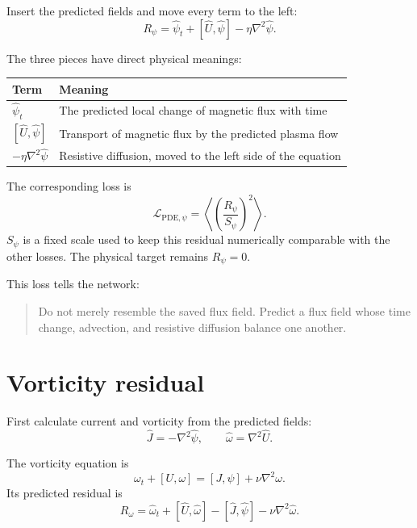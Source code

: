 \documentclass[11pt]{article}
\newcommand{\bracket}[2]{\left[#1,#2\right]}
\newcommand{\avg}[1]{\left\langle #1\right\rangle}
\newcommand{\Rpsi}{R_{\psi}}
\newcommand{\Romega}{R_{\omega}}
\newcommand{\Lpdepsi}{\mathcal L_{\mathrm{PDE},\psi}}
\begin{document}
Insert the predicted fields and move every term to the left:
\begin{equation}
\boxed{
\Rpsi
=\widehat\psi_t
+\bracket{\widehat U}{\widehat\psi}
-\eta\nabla^2\widehat\psi.
}
\label{eq:rpsi}
\end{equation}

The three pieces have direct physical meanings:
\begin{center}
\begin{tabularx}{0.94\textwidth}{>{\bfseries}p{} X}
\toprule
Term & Meaning\\
\midrule
$\widehat\psi_t$ & The predicted local change of magnetic flux with time\\
$\bracket{\widehat U}{\widehat\psi}$ & Transport of magnetic flux by the predicted plasma flow\\
$-\eta\nabla^2\widehat\psi$ & Resistive diffusion, moved to the left side of the equation\\
\bottomrule
\end{tabularx}
\end{center}

The corresponding loss is
\begin{equation}
\boxed{
\Lpdepsi=\avg{\left(\frac{\Rpsi}{S_{\psi}}\right)^2}.
}
\label{eq:lpdepsi}
\end{equation}
$S_{\psi}$ is a fixed scale used to keep this residual numerically comparable with the other losses. The physical target remains $\Rpsi=0$.

This loss tells the network:
\begin{quote}
Do not merely resemble the saved flux field. Predict a flux field whose time change, advection, and resistive diffusion balance one another.
\end{quote}

\section{Vorticity residual}

First calculate current and vorticity from the predicted fields:
\begin{equation}
\boxed{
\widehat J=-\nabla^2\widehat\psi,
\qquad
\widehat\omega=\nabla^2\widehat U.
}
\label{eq:derived}
\end{equation}

The vorticity equation is
\begin{equation}
\omega_t+\bracket{U}{\omega}
=\bracket{J}{\psi}+\nu\nabla^2\omega.
\end{equation}
Its predicted residual is
\begin{equation}
\boxed{
\Romega
=\widehat\omega_t
+\bracket{\widehat U}{\widehat\omega}
-\bracket{\widehat J}{\widehat\psi}
-\nu\nabla^2\widehat\omega.
}
\label{eq:romega}
\end{equation}
\end{document}

